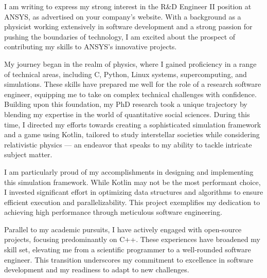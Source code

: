 \documentclass[11pt, a4paper]{awesome-cv}
\begin{document}
\makecvheader[R]

\makecvfooter
  {}%
  {}%
  {}

\makelettertitle

\begin{cvletter}


I am writing to express my strong interest in the R\&D Engineer II position at ANSYS, as advertised on your company's website. With a background as a physicist working extensively in software development and a strong passion for pushing the boundaries of technology, I am excited about the prospect of contributing my skills to ANSYS's innovative projects.

My journey began in the realm of physics, where I gained proficiency in a range of technical areas, including C, Python, Linux systems, supercomputing, and simulations. These skills have prepared me well for the role of a research software engineer, equipping me to take on complex technical challenges with confidence. Building upon this foundation, my PhD research took a unique trajectory by blending my expertise in the world of quantitative social sciences. During this time, I directed my efforts towards creating a sophisticated simulation framework and a game using Kotlin, tailored to study interstellar societies while considering relativistic physics — an endeavor that speaks to my ability to tackle intricate subject matter.

I am particularly proud of my accomplishments in designing and implementing this simulation framework. While Kotlin may not be the most performant choice, I invested significant effort in optimizing data structures and algorithms to ensure efficient execution and parallelizability. This project exemplifies my dedication to achieving high performance through meticulous software engineering.

Parallel to my academic pursuits, I have actively engaged with open-source projects, focusing predominantly on C++. These experiences have broadened my skill set, elevating me from a scientific programmer to a well-rounded software engineer. This transition underscores my commitment to excellence in software development and my readiness to adapt to new challenges.


\end{cvletter}
\end{document}
